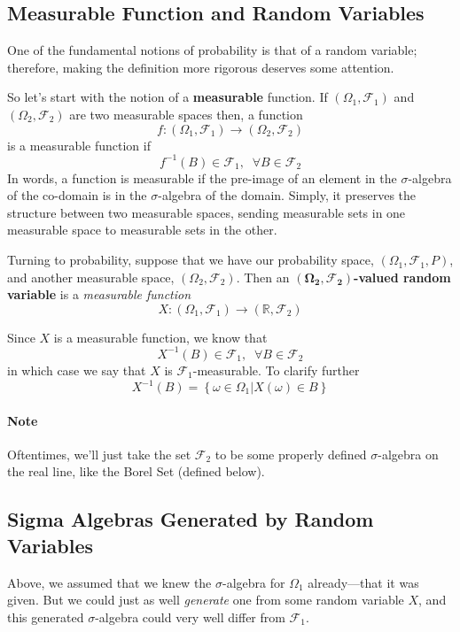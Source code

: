 \documentclass[a4paper,12pt]{article}
\theoremstyle{plain}
\theoremstyle{definition}
\theoremstyle{remark}
\begin{document}
\subsection{Measurable Function and Random Variables}

One of the fundamental notions of probability is that of a random
variable; therefore, making the definition more rigorous
deserves some attention.

So let's start with the notion of a \textbf{measurable} function.
If $(\Omega_1, \mathcal{F}_1)$ and $(\Omega_2, \mathcal{F}_2)$ are two
measurable spaces then, a function
   \[ f: (\Omega_1, \mathcal{F}_1) \rightarrow (\Omega_2, \mathcal{F}_2)
      \]
is a measurable function if
   \[ f^{-1}(B) \in \mathcal{F}_1, \;\; \forall B \in\mathcal{F}_2 \]
In words, a function is measurable if the pre-image of an element in
the $\sigma$-algebra of the co-domain is in the
$\sigma$-algebra of the domain.  Simply, it preserves the structure
between two measurable spaces, sending measurable sets
in one measurable space to measurable sets in the other.

Turning to probability, suppose  that we have our probability space,
$(\Omega_1, \mathcal{F}_1, P)$, and another measurable space,
$(\Omega_2,\mathcal{F}_2)$.  Then an
$\mathbf{(\Omega_2, \mathcal{F}_2)}$\textbf{-valued random variable}
is a \emph{measurable function}
\[ X: (\Omega_1, \mathcal{F}_1) \rightarrow (\mathbb{R},
   \mathcal{F}_2) \]

Since $X$ is a measurable function, we know that
   \[ X^{-1}(B) \in \mathcal{F}_1, \;\; \forall B \in \mathcal{F}_2\]
in which case we say that $X$ is $\mathcal{F}_1$-measurable.
To clarify further
   \[ X^{-1}(B) = \left\{ \omega \in \Omega_1 | X(\omega)
      \in B \right\} \]

\paragraph{Note} Oftentimes, we'll just take the set
$\mathcal{F}_2$ to be some properly
defined $\sigma$-algebra on the real line, like the Borel Set
(defined below).

\subsection{Sigma Algebras Generated by Random Variables}

Above, we assumed that we knew the $\sigma$-algebra for
$\Omega_1$ already---that it was given. But we
could just as well \emph{generate} one from some random variable $X$,
and this generated $\sigma$-algebra could very well differ from
$\mathcal{F}_1$.
\end{document}
